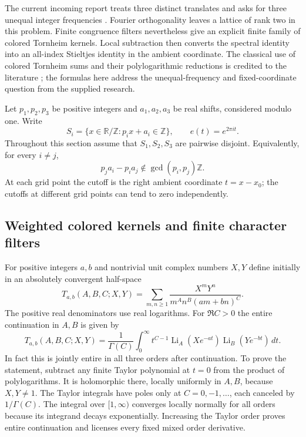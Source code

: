 \documentclass[11pt,a4paper]{article}
\numberwithin{equation}{section}
\theoremstyle{definition}
\theoremstyle{remark}
\DeclareMathOperator{\Li}{Li}
\begin{document}
The current incoming report treats three distinct translates and asks
for three unequal integer frequencies \cite{IncomingIdentities}.
Fourier orthogonality leaves a lattice of rank two in this problem.
Finite congruence filters nevertheless give an explicit finite family
of colored Tornheim kernels.  Local subtraction then converts the
spectral identity into an all-index Stieltjes identity in the ambient
coordinate.  The classical use of colored Tornheim sums and their
polylogarithmic reductions is credited to the literature
\cite{ZhaoColored}; the formulas here address the unequal-frequency
and fixed-coordinate question from the supplied research.

Let $p_1,p_2,p_3$ be positive integers and $a_1,a_2,a_3$ be real
shifts, considered modulo one.  Write
\[
 S_i=\{x\in\mathbb R/\mathbb Z:p_i x+a_i\in\mathbb Z\},
 \qquad e(t)=e^{2\pi i t}.
\]
Throughout this section assume that $S_1,S_2,S_3$ are pairwise
disjoint.  Equivalently, for every $i\ne j$,
\begin{equation}\label{xid:eq:triple-separation}
 p_j a_i-p_i a_j\notin\gcd(p_i,p_j)\mathbb Z.
\end{equation}
At each grid point the cutoff is the right ambient coordinate
$t=x-x_0$; the cutoffs at different grid points can tend to zero
independently.

\subsection{Weighted colored kernels and finite character filters}

For positive integers $a,b$ and nontrivial unit complex numbers $X,Y$
define initially in an absolutely convergent half-space
\begin{equation}\label{xid:eq:weighted-T}
 T_{a,b}(A,B,C;X,Y)
 =\sum_{m,n\ge1}\frac{X^mY^n}{m^A n^B(am+bn)^C}.
\end{equation}
The positive real denominators use real logarithms.  For $\Re C>0$
the entire continuation in $A,B$ is given by
\begin{equation}\label{xid:eq:weighted-T-mellin}
 T_{a,b}(A,B,C;X,Y)
 =\frac1{\Gamma(C)}\int_0^\infty t^{C-1}
        \Li_A(Xe^{-at})\Li_B(Ye^{-bt})\,dt.
\end{equation}
In fact this is jointly entire in all three orders after continuation.
To prove the statement, subtract any finite Taylor polynomial at
$t=0$ from the product of polylogarithms.  It is holomorphic there,
locally uniformly in $A,B$, because $X,Y\ne1$.  The Taylor integrals
have poles only at $C=0,-1,\ldots$, each canceled by $1/\Gamma(C)$.
The integral over $[1,\infty)$ converges locally normally for all
orders because its integrand decays exponentially.  Increasing the
Taylor order proves entire continuation and licenses every fixed
mixed order derivative.
\end{document}
